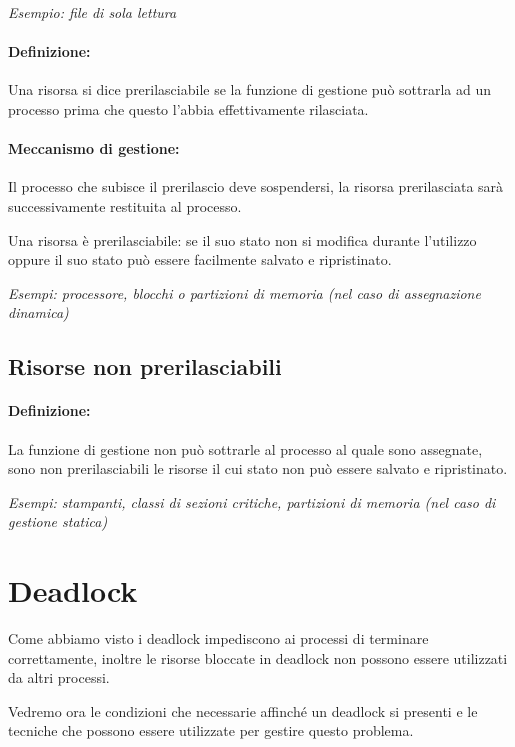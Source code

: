 \textit{Esempio: file di sola lettura}


\paragraph{Definizione:} Una risorsa si dice prerilasciabile se la funzione di gestione può sottrarla ad un processo prima che questo l'abbia effettivamente rilasciata.

\paragraph{Meccanismo di gestione:} Il processo che subisce il prerilascio deve sospendersi, la risorsa prerilasciata sarà successivamente restituita al processo.

Una risorsa è prerilasciabile: se il suo stato non si modifica durante l'utilizzo oppure il suo stato può essere facilmente salvato e ripristinato.

\textit{Esempi: processore, blocchi o partizioni di memoria
(nel caso di assegnazione dinamica)}

\subsection{Risorse non prerilasciabili}

\paragraph{Definizione:} La funzione di gestione non può sottrarle al processo al quale sono assegnate, sono non prerilasciabili le risorse il cui stato non può essere salvato e ripristinato.

\textit{Esempi: stampanti, classi di sezioni critiche, partizioni di memoria (nel caso di gestione statica)}

\section{Deadlock}
Come abbiamo visto i deadlock impediscono ai processi di terminare correttamente, inoltre le risorse bloccate in deadlock non possono essere utilizzati da altri processi.

Vedremo ora le condizioni che necessarie affinché un deadlock si presenti e le tecniche che possono essere utilizzate per gestire  questo problema.


